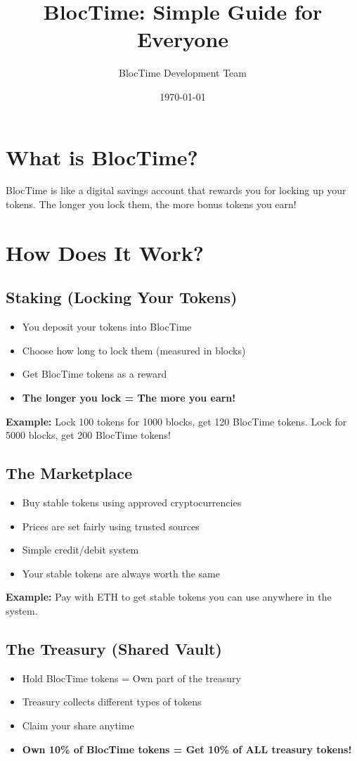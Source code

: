 \documentclass[11pt,a4paper]{article}
\title{BlocTime: Simple Guide for Everyone}
\author{BlocTime Development Team}
\date{\today}
\begin{document}
\maketitle

\section{What is BlocTime?}

BlocTime is like a digital savings account that rewards you for locking up your tokens. The longer you lock them, the more bonus tokens you earn!

\section{How Does It Work?}

\subsection{Staking (Locking Your Tokens)}
\begin{itemize}
\item You deposit your tokens into BlocTime
\item Choose how long to lock them (measured in blocks)
\item Get BlocTime tokens as a reward
\item \textbf{The longer you lock = The more you earn!}
\end{itemize}

\textbf{Example:} Lock 100 tokens for 1000 blocks, get 120 BlocTime tokens. Lock for 5000 blocks, get 200 BlocTime tokens!

\subsection{The Marketplace}
\begin{itemize}
\item Buy stable tokens using approved cryptocurrencies
\item Prices are set fairly using trusted sources
\item Simple credit/debit system
\item Your stable tokens are always worth the same
\end{itemize}

\textbf{Example:} Pay with ETH to get stable tokens you can use anywhere in the system.

\subsection{The Treasury (Shared Vault)}
\begin{itemize}
\item Hold BlocTime tokens = Own part of the treasury
\item Treasury collects different types of tokens
\item Claim your share anytime
\item \textbf{Own 10\% of BlocTime tokens = Get 10\% of ALL treasury tokens!}
\end{itemize}
\end{document}
